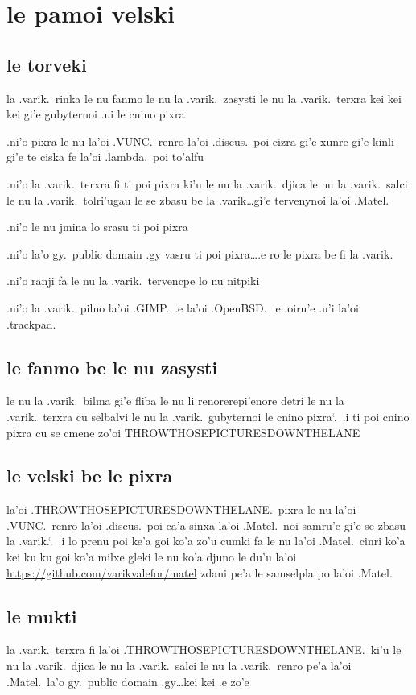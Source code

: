\documentclass{report}
\newcommand\sds{\spacefactor\sfcode`.\ \space}
\begin{document}
\section{le pamoi velski}
\subsection{le torveki}
la .varik.\ rinka le nu fanmo le nu la .varik.\ zasysti le nu la .varik.\ terxra kei kei kei gi'e gubyternoi .ui le cnino pixra

.ni'o pixra le nu la'oi .VUNC.\ renro la'oi .discus.\ poi cizra gi'e xunre gi'e kinli gi'e te ciska fe la'oi .lambda.\ poi to'alfu

.ni'o la .varik.\ terxra fi ti poi pixra ki'u le nu la .varik.\ djica le nu la .varik.\ salci le nu la .varik.\ tolri'ugau le se zbasu be la .varik\ldots gi'e tervenynoi la'oi .Matel.

.ni'o le nu jmina lo srasu ti poi pixra

.ni'o la'o gy.\ public domain .gy vasru ti poi pixra\ldots .e ro le pixra be fi la .varik.

.ni'o ranji fa le nu la .varik.\ tervencpe lo nu nitpiki

.ni'o la .varik.\ pilno la'oi .GIMP.\ .e la'oi .OpenBSD.\ .e .oiru'e .u'i la'oi .trackpad.

\subsection{le fanmo be le nu zasysti}
le nu la .varik.\ bilma gi'e fliba le nu li renorerepi'enore detri le nu la .varik.\ terxra cu selbalvi le nu la .varik.\ gubyternoi le cnino pixra\sds  .i ti poi cnino pixra cu se cmene zo'oi THROWTHOSEPICTURESDOWNTHELANE

\subsection{le velski be le pixra}
la'oi .THROWTHOSEPICTURESDOWNTHELANE.\ pixra le nu la'oi .VUNC.\ renro la'oi .discus.\ poi ca'a sinxa la'oi .Matel.\ noi samru'e gi'e se zbasu la .varik.\sds  .i lo prenu poi ke'a goi ko'a zo'u cumki fa le nu la'oi .Matel.\ cinri ko'a kei ku ku goi ko'a milxe gleki le nu ko'a djuno le du'u la'oi \url{https://github.com/varikvalefor/matel} zdani pe'a le samselpla po la'oi .Matel.

\subsection{le mukti}
la .varik.\ terxra fi la'oi .THROWTHOSEPICTURESDOWNTHELANE.\ ki'u le nu la .varik.\ djica le nu la .varik.\ salci le nu la .varik.\ renro pe'a la'oi .Matel.\ la'o gy.\ public domain .gy\ldots kei kei .e zo'e
\end{document}
